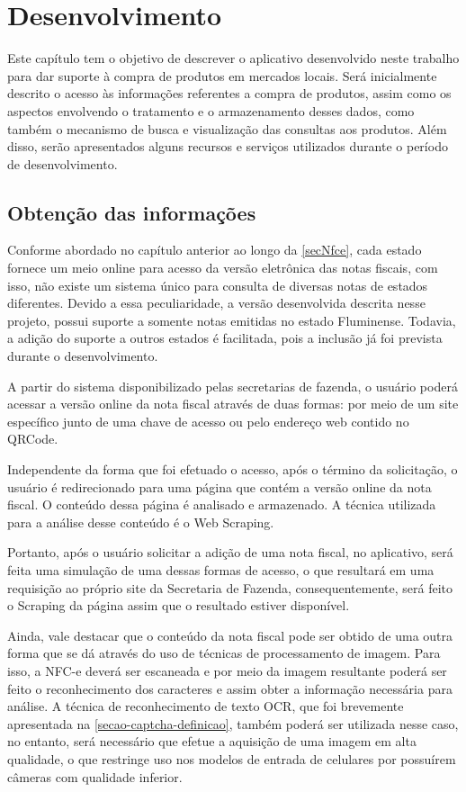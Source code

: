 \chapter{Desenvolvimento}

Este capítulo tem o objetivo de descrever o aplicativo desenvolvido neste trabalho para dar suporte à compra de produtos em mercados locais. Será inicialmente descrito o acesso às informações referentes a compra de produtos, assim como os aspectos envolvendo o tratamento e o armazenamento desses dados, como também o mecanismo de busca e visualização das consultas aos produtos. Além disso, serão apresentados alguns recursos e serviços utilizados durante o período de desenvolvimento.

\section{Obtenção das informações}
\label{obtencaoInformacoes}

Conforme abordado no capítulo anterior ao longo da \autoref{secNfce}, cada estado fornece um meio online para acesso da versão eletrônica das notas fiscais, com isso, não existe um sistema único para consulta de diversas notas de estados diferentes. Devido a essa peculiaridade, a versão desenvolvida descrita nesse projeto, possui suporte a somente notas emitidas no estado Fluminense. Todavia, a adição do suporte a outros estados é facilitada, pois a inclusão já foi prevista durante o desenvolvimento.

A partir do sistema disponibilizado pelas secretarias de fazenda, o usuário poderá acessar a versão online da nota fiscal através de duas formas: por meio de um site específico junto de uma chave de acesso ou pelo endereço web contido no QRCode.

Independente da forma que foi efetuado o acesso, após o término da solicitação, o usuário é redirecionado para uma página que contém a versão online da nota fiscal. O conteúdo dessa página é analisado e armazenado. A técnica utilizada para a análise desse conteúdo é o Web Scraping.

Portanto, após o usuário solicitar a adição de uma nota fiscal, no aplicativo, será feita uma simulação de uma dessas formas de acesso, o que resultará em uma requisição ao próprio site da Secretaria de Fazenda, consequentemente, será feito o Scraping da página assim que o resultado estiver disponível.

Ainda, vale destacar que o conteúdo da nota fiscal pode ser obtido de uma outra forma que se dá através do uso de técnicas de processamento de imagem. Para isso, a NFC-e deverá ser escaneada e por meio da imagem resultante poderá ser feito o reconhecimento dos caracteres e assim obter a informação necessária para análise. A técnica de reconhecimento de texto OCR, que foi brevemente apresentada na \autoref{secao-captcha-definicao}, também poderá ser utilizada nesse caso, no entanto, será necessário que efetue a aquisição de uma imagem em alta qualidade, o que restringe uso nos modelos de entrada de celulares por possuírem câmeras com qualidade inferior.

